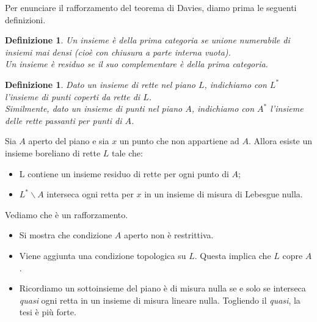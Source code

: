 \documentclass[11pt]{beamer} %
\newcommand{\<}{\langle}
\renewcommand{\>}{\rangle}
\theoremstyle{theorem}
\theoremstyle{theorem}
\theoremstyle{theorem}
\theoremstyle{theorem}
\newtheorem{defin}[teo]{Definizione}
\theoremstyle{theorem}
\begin{document}
\begin{frame}[fragile]
	Per enunciare il rafforzamento del teorema di Davies, diamo prima le seguenti definizioni.\\
	\pause	
	\begin{defin}
	Un insieme è della prima categoria se unione numerabile di insiemi mai densi (cioè con chiusura a parte interna vuota).\\ \pause
	Un insieme è residuo se il suo complementare è della prima categoria. 
	\end{defin}
	\pause
	\begin{defin}
	Dato un insieme di rette nel piano $L$, indichiamo con $L^*$ l'insieme di punti coperti da rette di $L$.\\
	\pause
	Similmente, dato un insieme di punti nel piano $A$, indichiamo con $A^*$ l'insieme delle rette passanti per punti di $A$.
	\end{defin}

\end{frame}

\begin{frame}[fragile]

\begin{lemma}[1]
	Sia $A$ aperto del piano e sia $x$ un punto che non appartiene ad $A$. Allora esiste un insieme boreliano di rette $L$ tale che:\\
	\begin{itemize}
		\item L contiene un insieme residuo di rette per ogni punto di $A$;\\
		\item $L^{*} \backslash A$ interseca ogni retta per $x$ in un insieme di misura di Lebesgue nulla.\\
	\end{itemize}
\end{lemma}
	\pause
	Vediamo che è un rafforzamento.\\
	\pause
	\begin{itemize}
		\item Si mostra che condizione $A$ aperto non è restrittiva.\\
		\pause
		\item Viene aggiunta una condizione topologica su $L$. Questa implica che $L$ copre $A$.\\
		\pause
		\item Ricordiamo un sottoinsieme del piano è di misura nulla se e solo se interseca \emph{quasi} ogni retta in un insieme di misura lineare nulla. Togliendo il \emph{quasi}, la tesi è più forte.\\
	\end{itemize}

\end{frame}
\end{document}
